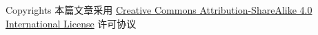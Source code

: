 \begin{frame}[fragile]{Copyrights}
	本篇文章采用 \href{http://creativecommons.org/licenses/by-sa/4.0/}{Creative Commons
		Attribution-ShareAlike 4.0 International License} 许可协议
	\begin{center}\ccbysa\end{center}
\end{frame}